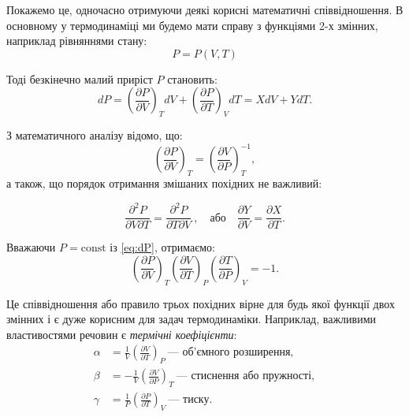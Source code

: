 Покажемо це, одночасно отримуючи деякі корисні математичні співвідношення. В основному у
термодинаміці ми будемо мати справу з функціями 2-х змінних, наприклад рівняннями стану:
\begin{equation*}
	P = P(V, T)
\end{equation*}

Тоді безкінечно малий приріст $P$ становить:
\begin{equation}\label{eq:dP}
	dP = \left(\frac{\partial P}{\partial V}\right)_T dV +  \left(\frac{\partial P}{\partial
		T}\right)_V dT = X dV + YdT.
\end{equation}

З математичного аналізу відомо, що:
\begin{equation*}
	\left(\frac{\partial P}{\partial V}\right)_T = \left(\frac{\partial V}{\partial P}\right)_T^{-1},
\end{equation*}
а також, що порядок отримання змішаних похідних не важливий:

\begin{equation}\label{eq:ddP}
	\frac{\partial^2 P}{\partial V \partial T} = \frac{\partial^2 P}{\partial T \partial V }\ , \quad
	\text{або}\quad \frac{\partial Y}{\partial V} = \frac{\partial X}{\partial T}.
\end{equation}

Вважаючи $P = \mathrm{const}$ із \eqref{eq:dP}, отримаємо:
\begin{equation}\label{eq:-1}
	\left(\frac{\partial P}{\partial V}\right)_T  \left(\frac{\partial V}{\partial T}\right)_P
	\left(\frac{\partial T}{\partial P}\right)_V = -1.
\end{equation}

Це співвідношення або правило трьох похідних вірне для будь якої функції двох змінних і є дуже
корисним для задач термодинаміки. Наприклад, важливими властивостями речовин є \emph{термічні
	коефіцієнти}:
\begin{align*}
	\alpha & = \frac{1}{V} \left(\frac{\partial V}{\partial T} \right)_P\ \text{--- об'ємного
	розширення},                                                                                   \\
	\beta  & = -\frac{1}{V} \left(\frac{\partial V}{\partial P} \right)_T\ \text{--- стиснення або
	пружності},                                                                                    \\
	\gamma & = \frac{1}{P} \left(\frac{\partial P}{\partial T} \right)_V\ \text{--- тиску}.
\end{align*}

